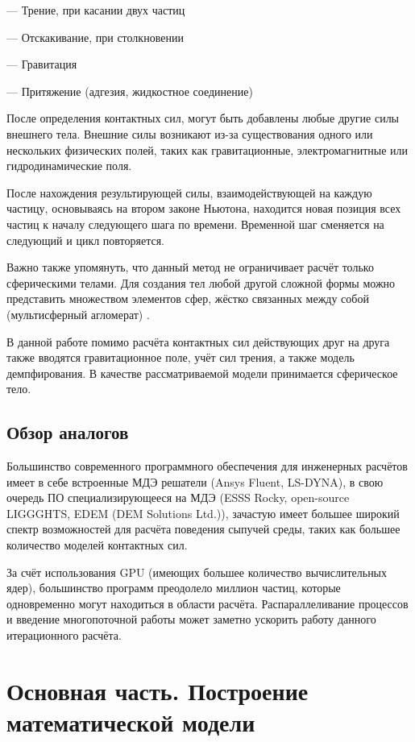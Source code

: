 \documentclass[a4paper]{article}
\begin{document}
--- Трение, при касании двух частиц

--- Отскакивание, при столкновении

--- Гравитация

--- Притяжение (адгезия, жидкостное соединение)

После определения контактных сил, могут быть добавлены любые другие силы внешнего тела. 
Внешние силы возникают из-за существования одного или нескольких физических полей, таких как гравитационные, электромагнитные или гидродинамические поля.

После нахождения результирующей силы, взаимодействующей на каждую частицу, основываясь на втором законе Ньютона, находится новая позиция всех частиц к началу следующего шага по времени.
Временной шаг сменяется на следующий и цикл повторяется.

Важно также упомянуть, что данный метод не ограничивает расчёт только сферическими телами. Для создания тел любой другой сложной формы можно представить множеством элементов сфер, жёстко связанных между собой (мультисферный агломерат) \cite{aglomerath}.

В данной работе помимо расчёта контактных сил действующих друг на друга также вводятся гравитационное поле, учёт сил трения, а также модель демпфирования. 
В качестве рассматриваемой модели принимается сферическое тело.

\subsection{Обзор аналогов}

Большинство современного программного обеспечения для инженерных расчётов имеет в себе встроенные МДЭ решатели (Ansys Fluent, LS-DYNA), в свою очередь ПО специализирующееся на МДЭ (ESSS Rocky, open-source LIGGGHTS, EDEM (DEM Solutions Ltd.)), зачастую имеет большее широкий спектр возможностей для расчёта поведения сыпучей среды, таких как большее количество моделей контактных сил.

За счёт использования GPU (имеющих большее количество вычислительных ядер), большинство программ преодолело миллион частиц, которые одновременно могут находиться в области расчёта. 
Распараллеливание процессов и введение многопоточной работы может заметно ускорить работу данного итерационного расчёта.

\newpage

\section{Основная часть. Построение математической модели}
\end{document}
